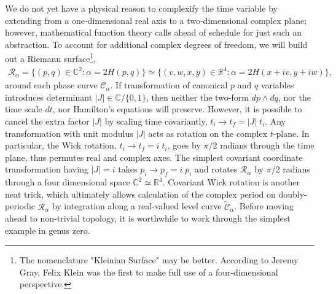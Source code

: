 \documentclass[nofootinbib,preprint]{revtex4-1}
\begin{document}
We do not yet have a physical reason to complexify the time variable by extending from a one-dimensional
real axis to a two-dimensional complex plane; however, mathematical function theory calls ahead of 
schedule for just such an abstraction. To account for additional complex degrees of freedom, we will build out a Riemann 
surface\footnote{The nomenclature "Kleinian Surface" may be better.
According to Jeremy Gray, Felix Klein was the first to make full use of a four-dimensional 
perspective. }, 
\begin{eqnarray}
\mathcal{R}_{\alpha} = \{(p,q) \in \mathbb{C}^2: \alpha=2H(p,q) \} 
\simeq \{(v,w,x,y) \in \mathbb{R}^4: \alpha=2H(x+i v,y+i w) \},\nonumber
\end{eqnarray}
around each phase curve $\mathcal{C}_{\alpha}$. If transformation of canonical $p$ and $q$ 
variables introduces determinant $|J| \in \mathbb{C}/\{0,1\}$, then neither the two-form 
$dp \wedge dq$, nor the time scale $dt$, nor Hamilton's equations will preserve. However, 
it is possible to cancel the extra factor $|J|$ by scaling time covariantly, 
$t_i \rightarrow t_f = |J|\;t_i$. Any transformation with unit modulus $|J|$ acts as 
rotation on the complex $t$-plane. In particular, the Wick rotation,  
$t_i\rightarrow t_f = i \; t_i$, goes by $\pi/2$ radians through the time plane, 
thus permutes real and complex axes. The simplest covariant coordinate transformation
having $|J|=i$ takes $p_i\rightarrow p_f=i\;p_i$ and rotates $\mathcal{R}_{\alpha}$  by 
$\pi/2$ radians through a four dimensional space $\mathbb{C}^2 \simeq \mathbb{R}^4$.
Covariant Wick rotation is another neat trick, which ultimately allows calculation of 
the complex period on doubly-periodic $\mathcal{R}_{\alpha}$ by integration along a 
real-valued level curve $\widetilde{\mathcal{C}}_{\alpha}$. Before moving ahead to non-trivial 
topology, it is worthwhile to work through the simplest example in genus zero.
\end{document}
